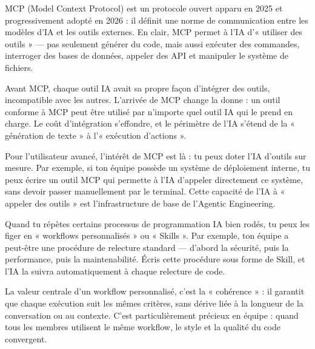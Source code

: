 


MCP (Model Context Protocol) est un protocole ouvert apparu en 2025 et progressivement adopté en 2026 : il définit une norme de communication entre les modèles d'IA et les outils externes. En clair, MCP permet à l'IA d'« utiliser des outils » — pas seulement générer du code, mais aussi exécuter des commandes, interroger des bases de données, appeler des API et manipuler le système de fichiers.

Avant MCP, chaque outil IA avait sa propre façon d'intégrer des outils, incompatible avec les autres. L'arrivée de MCP change la donne : un outil conforme à MCP peut être utilisé par n'importe quel outil IA qui le prend en charge. Le coût d'intégration s'effondre, et le périmètre de l'IA s'étend de la « génération de texte » à l'« exécution d'actions ».

Pour l'utilisateur avancé, l'intérêt de MCP est là : tu peux doter l'IA d'outils sur mesure. Par exemple, si ton équipe possède un système de déploiement interne, tu peux écrire un outil MCP qui permette à l'IA d'appeler directement ce système, sans devoir passer manuellement par le terminal. Cette capacité de l'IA à « appeler des outils » est l'infrastructure de base de l'Agentic Engineering.


Quand tu répètes certains processus de programmation IA bien rodés, tu peux les figer en « workflows personnalisés » ou « Skills ». Par exemple, ton équipe a peut-être une procédure de relecture standard — d'abord la sécurité, puis la performance, puis la maintenabilité. Écris cette procédure sous forme de Skill, et l'IA la suivra automatiquement à chaque relecture de code.

La valeur centrale d'un workflow personnalisé, c'est la « cohérence » : il garantit que chaque exécution suit les mêmes critères, sans dérive liée à la longueur de la conversation ou au contexte. C'est particulièrement précieux en équipe : quand tous les membres utilisent le même workflow, le style et la qualité du code convergent.

